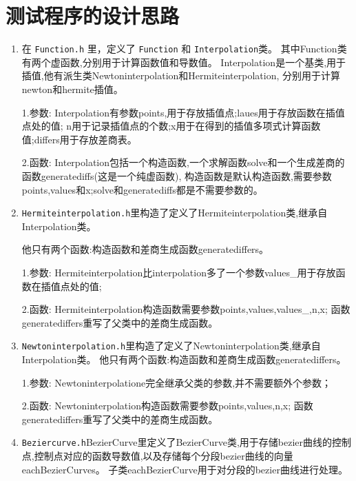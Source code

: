 \documentclass[UTF8]{ctexart}
\begin{document}
\pagestyle{fancy}
\fancyhead{}

\section{测试程序的设计思路}
\begin{enumerate}
    \item 在 \texttt{Function.h} 里，定义了 \texttt{Function} 和 \texttt{Interpolation}类。
        其中Function类有两个虚函数,分别用于计算函数值和导数值。
        Interpolation是一个基类,用于插值,他有派生类Newtoninterpolation和Hermiteinterpolation,
        分别用于计算newton和hermite插值。
    \par 1.参数: Interpolation有参数points,用于存放插值点;laues用于存放函数在插值点处的值;
        n用于记录插值点的个数;x用于在得到的插值多项式计算函数值;differs用于存放差商表。
    \par 2.函数: Interpolation包括一个构造函数,一个求解函数solve和一个生成差商的函数generatediffs(这是一个纯虚函数),
        构造函数是默认构造函数,需要参数points,values和x;solve和generatediffs都是不需要参数的。
    \item \texttt{Hermiteinterpolation.h}里构造了定义了Hermiteinterpolation类,继承自Interpolation类。
    
        他只有两个函数:构造函数和差商生成函数generatediffers。
    \par 1.参数: Hermiteinterpolation比interpolation多了一个参数values\_用于存放函数在插值点处的值;
    \par 2.函数: Hermiteinterpolation构造函数需要参数points,values,values\_,n,x;
        函数generatediffers重写了父类中的差商生成函数。

    \item \texttt{Newtoninterpolation.h}里构造了定义了Newtoninterpolation类,继承自Interpolation类。
        他只有两个函数:构造函数和差商生成函数generatediffers。
    \par 1.参数: Newtoninterpolatione完全继承父类的参数,并不需要额外个参数；
    \par 2.函数: Newtoninterpolation构造函数需要参数points,values,n,x;
        函数generatediffers重写了父类中的差商生成函数。

    \item \texttt{Beziercurve.h}BezierCurve里定义了BezierCurve类,用于存储bezier曲线的控制点,控制点对应的函数导数值,以及存储每个分段bezier曲线的向量eachBezierCurves。
    子类eachBezierCurve用于对分段的bezier曲线进行处理。


\end{enumerate}
\end{document}
